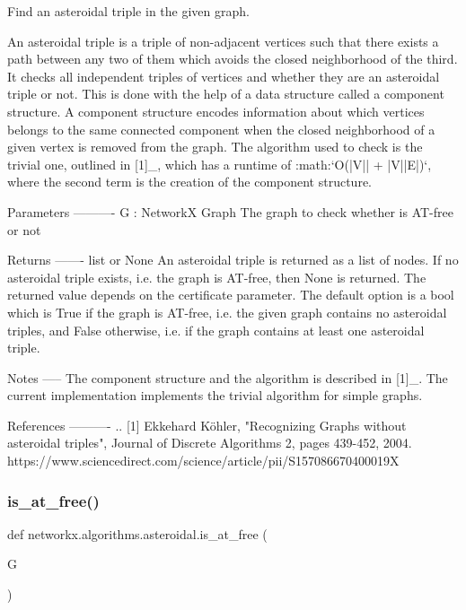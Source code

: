 \begin{DoxyVerb}Find an asteroidal triple in the given graph.

An asteroidal triple is a triple of non-adjacent vertices such that
there exists a path between any two of them which avoids the closed
neighborhood of the third. It checks all independent triples of vertices
and whether they are an asteroidal triple or not. This is done with the
help of a data structure called a component structure.
A component structure encodes information about which vertices belongs to
the same connected component when the closed neighborhood of a given vertex
is removed from the graph. The algorithm used to check is the trivial
one, outlined in [1]_, which has a runtime of
:math:`O(|V|| + |V||E|)`, where the second term is the
creation of the component structure.

Parameters
----------
G : NetworkX Graph
    The graph to check whether is AT-free or not

Returns
-------
list or None
    An asteroidal triple is returned as a list of nodes. If no asteroidal
    triple exists, i.e. the graph is AT-free, then None is returned.
    The returned value depends on the certificate parameter. The default
    option is a bool which is True if the graph is AT-free, i.e. the
    given graph contains no asteroidal triples, and False otherwise, i.e.
    if the graph contains at least one asteroidal triple.

Notes
-----
The component structure and the algorithm is described in [1]_. The current
implementation implements the trivial algorithm for simple graphs.

References
----------
.. [1] Ekkehard Köhler,
   "Recognizing Graphs without asteroidal triples",
   Journal of Discrete Algorithms 2, pages 439-452, 2004.
   https://www.sciencedirect.com/science/article/pii/S157086670400019X
\end{DoxyVerb}
 \mbox{\label{namespacenetworkx_1_1algorithms_1_1asteroidal_a23c0fabd6a68cfcba6aef2b8e2e07d95}} 
\subsubsection{\texorpdfstring{is\+\_\+at\+\_\+free()}{is\_at\_free()}}
{\footnotesize\ttfamily def networkx.\+algorithms.\+asteroidal.\+is\+\_\+at\+\_\+free (\begin{DoxyParamCaption}\item[{}]{G }\end{DoxyParamCaption})}

